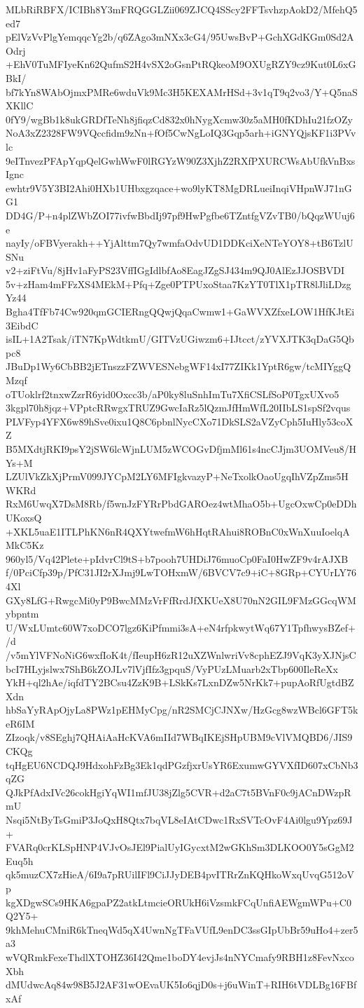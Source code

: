 MLbRiRBFX/ICIBh8Y3mFRQGGLZii069ZJCQ4SScy2FFTsvhzpAokD2/MfehQ5ed7
pElVzVvPlgYemqqcYg2b/q6ZAgo3mNXx3cG4/95UwsBvP+GchXGdKGm0Sd2AOdrj
+EhV0TuMFIyeKn62QufmS2H4vSX2oGsnPtRQkeoM9OXUgRZY9cz9Kut0L6xGBkI/
bf7kYn8WAbOjmxPMRe6wduVk9Mc3H5KEXAMrHSd+3v1qT9q2vo3/Y+Q5naSXKllC
0fY9/wgBb1k8ukGRDfTeNh8jfiqzCd832x0hNygXcmw30z5aMH0fKDhIu21fzOZy
NoA3xZ2328FW9VQccfidm9zNn+fOf5CwNgLoIQ3Gqp5arh+iGNYQjsKF1i3PVvlc
9eITnvezPFApYqpQelGwhWwF0lRGYzW90Z3XjhZ2RXfPXURCWsAbUfkVnBxsIgnc
ewhtr9V5Y3BI2Ahi0HXb1UHbxgzqace+wo9lyKT8MgDRLueiInqiVHpnWJ71nGG1
DD4G/P+n4plZWbZOI77ivfwBbdIj97pf9HwPgfbe6TZntfgVZvTB0/bQqzWUuj6e
nayIy/oFBVyerakh++YjAlttm7Qy7wmfaOdvUD1DDKciXeNTeYOY8+tB6TzlUSNu
v2+ziFtVu/8jHv1aFyPS23VffIGgIdlbfAo8EagJZgSJ434m9QJ0AlEzJJOSBVDI
5v+zHam4mFFzXS4MEkM+Pfq+Zge0PTPUxoStaa7KzYT0TlX1pTR8lJliLDzgYz44
Bgha4TfFb74Cw920qmGCIERngQQwjQqaCwmw1+GaWVXZfxeLOW1HfKJtEi3EibdC
isIL+1A2Tsak/iTN7KpWdtkmU/GITVzUGiwzm6+IJtcct/zYVXJTK3qDaG5Qbpc8
JBuDp1Wy6CbBB2jETnszzFZWVESNebgWF14xI77ZIKk1YptR6gw/tcMIYggQMzqf
oTUoklrf2tnxwZzrR6yid0Oxcc3b/aP0ky8luSnhImTu7XfiCSLfSoP0TgxUXvo5
3kgpl70h8jqz+VPptcRRwgxTRUZ9GwcIaRz5lQzmJfHmWfL20IIbLS1spSf2vqus
PLVFyp4YFX6w89hSve0ixu1Q8C6pbnlNycCXo71DkSLS2aVZyCph5IuHly53coXZ
B5MXdtjRKI9psY2jSW6lcWjnLUM5zWCOGvDfjmMl61s4ncCJjm3UOMVeu8/HYs+M
LZUlVkZkXjPrmV099JYCpM2LY6MFIgkvazyP+NeTxolkOaoUgqIhVZpZms5HWKRd
RxM6UwqX7DsM8Rb/f5wnJzFYRrPbdGAROez4wtMhaO5b+UgcOxwCp0eDDhUKoxsQ
+XKL5uaE1ITLPhKN6nR4QXYtwefmW6hHqtRAhui8ROBnC0xWnXuuIoelqAMkC5Kz
960yl5/Vq42Plete+pIdvrCl9tS+b7pooh7UHDiJ76muoCp0FaI0HwZF9v4rAJXB
f/0PciCfp39p/PfC31JI2rXJmj9LwTOHxmW/6BVCV7c9+iC+8GRp+CYUrLY764Xl
GXy8LfG+RwgcMi0yP9BwcMMzVrFfRrdJfXKUeX8U70nN2GIL9FMzGGcqWMybpntm
U/WxLUmtc60W7xoDCO7lgz6KiPfmmi3sA+eN4rfpkwytWq67Y1TpfhwysBZef+/d
/v5mYlVFNoNiG6wxfIoK4t/fIeupH6zR12uXZWnlwriVv8cphEZJ9VqK3yXJNjsC
bcI7HLyjslwx7ShB6kZOJLv7lVjfIfz3gpquS/VyPUzLMuarb2xTbp600IleReXx
YkH+ql2hAe/iqfdTY2BCsu4ZzK9B+LSkKs7LxnDZw5NrKk7+pupAoRfUgtdBZXdn
hbSaYyRApOjyLa8PWz1pEHMyCpg/nR2SMCjCJNXw/HzGcg8wzWBcl6GFT5keR6IM
ZIzoqk/v8SEghj7QHAiAaHcKVA6mIId7WBqIKEjSHpUBM9cVlVMQBD6/JIS9CKQg
tqHgEU6NCDQJ9HdxohFzBg3Ek1qdPGzfjxrUsYR6ExumwGYVXfID607xCbNb3qZG
QJkPfAdxIVc26cokHgiYqWI1mfJU38jZlg5CVR+d2aC7t5BVnF0c9jACnDWzpRmU
Nsqi5NtByTsGmiP3JoQxH8Qtx7bqVL8eIAtCDwc1RxSVTcOvF4Ai0lgu9Ypz69J+
FVARq0crKLSpHNP4VJvOsJEl9PialUyIGycxtM2wGKhSm3DLKOO0Y5sGgM2Euq5h
qk5muzCX7zHieA/6I9a7pRUilIFl9CiJJyDEB4pvITRrZnKQHkoWxqUvqG512oVp
kgXDgwSCs9HKA6gpaPZ2atkLtmcieORUkH6iVzsmkFCqUnfiAEWgmWPu+C0Q2Y5+
9khMehuCMniR6kTneqWd5qX4UwnNgTFaVUfL9enDC3ssGIpUbBr59uHo4+zer5a3
wVQRmkFexeThdlXTOHZ36I42Qme1boDY4evjJs4nNYCmafy9RBH1z8FevNxcoXbh
dMUdwcAq84w98B5J2AF31wOEvaUK5Io6qjD0s+j6uWinT+RIH6tVDLBg16FBfxAf
